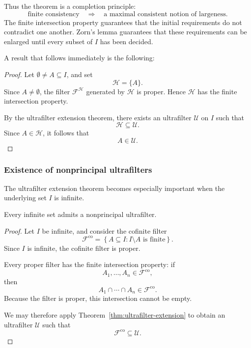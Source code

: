 {Thus the theorem is a completion principle:
\[
\boxed{
\text{finite consistency}
\quad\Longrightarrow\quad
\text{a maximal consistent notion of largeness}.
}
\]
The finite intersection property guarantees that the initial requirements
do not contradict one another. Zorn's lemma guarantees that these
requirements can be enlarged until every subset of \(I\) has been decided.

A result that follows immediately is the following:

\begin{proof}
    Let \(\emptyset\neq A\subseteq I\), and set
\[
\mathcal{H}=\{A\}.
\]
Since \(A\neq\emptyset\), the filter \(\mathcal{F}^{\mathcal{H}}\) generated by
\(\mathcal{H}\) is proper. Hence \(\mathcal{H}\) has the finite intersection
property.

By the ultrafilter extension theorem, there exists an ultrafilter
\(\mathcal{U}\) on \(I\) such that
\[
\mathcal{H}\subseteq\mathcal{U}.
\]
Since \(A\in\mathcal{H}\), it follows that
\[
A\in\mathcal{U}.
\]
\end{proof}

\subsubsection{Existence of nonprincipal ultrafilters}

The ultrafilter extension theorem becomes especially important when the
underlying set \(I\) is infinite.

\begin{cor}
\label{cor:nonprincipal-ultrafilter}
Every infinite set admits a nonprincipal ultrafilter.
\end{cor}

\begin{proof}
Let \(I\) be infinite, and consider the cofinite filter
\[
\mathcal{F}^{\mathrm{co}}
=
\left\{
A\subseteq I:
I\setminus A\text{ is finite}
\right\}.
\]
Since \(I\) is infinite, the cofinite filter is proper.

Every proper filter has the finite intersection property: if
\[
A_1,\ldots,A_n\in\mathcal{F}^{\mathrm{co}},
\]
then
\[
A_1\cap\cdots\cap A_n\in\mathcal{F}^{\mathrm{co}}.
\]
Because the filter is proper, this intersection cannot be empty.

We may therefore apply
Theorem~\ref{thm:ultrafilter-extension} to obtain an ultrafilter
\(\mathcal{U}\) such that
\[
\mathcal{F}^{\mathrm{co}}
\subseteq
\mathcal{U}.
\]


\end{proof}}
